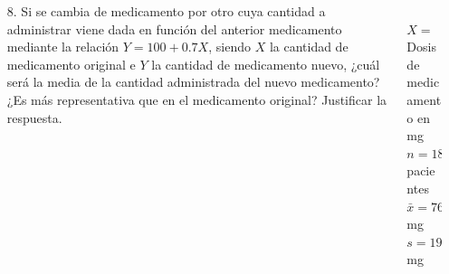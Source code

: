 \documentclass[aspectratio=149,10pt,xcolor=dvipsnames,t]{beamer}
\begin{document}
\begin{frame}
\begin{columns}
\begin{column}[T]{0.65\textwidth}
\begin{enumerate}
\item[8.] Si se cambia de medicamento por otro cuya cantidad a administrar viene dada en función del anterior medicamento
mediante la relación $Y=100+0.7X$, siendo $X$ la cantidad de medicamento original e $Y$ la cantidad de medicamento
nuevo, ¿cuál será la media de la cantidad administrada del nuevo medicamento? ¿Es más representativa que en el
medicamento original? Justificar la respuesta.
\end{enumerate}
\end{column}
\begin{column}[T]{0.35\textwidth}
\\
$X=$ Dosis de medicamento en mg\\
$n=180$ pacientes\\
$\bar x=765$ mg\\
$s=198.1792$ mg
\end{column}
\end{columns}
\end{frame}
\end{document}
